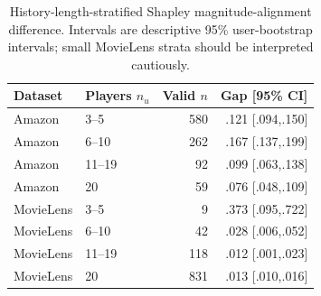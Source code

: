 \begin{table}[ht]
\centering\small
\caption{History-length-stratified Shapley magnitude-alignment difference. Intervals are descriptive 95\% user-bootstrap intervals; small MovieLens strata should be interpreted cautiously.}
\label{tab:history-stratified-gap}
\begin{tabular}{llrr}
\toprule
Dataset & Players $n_u$ & Valid $n$ & Gap [95\% CI] \\
\midrule
Amazon & 3--5 & 580 & .121 [.094,.150] \\
Amazon & 6--10 & 262 & .167 [.137,.199] \\
Amazon & 11--19 & 92 & .099 [.063,.138] \\
Amazon & 20 & 59 & .076 [.048,.109] \\
\midrule
MovieLens & 3--5 & 9 & .373 [.095,.722] \\
MovieLens & 6--10 & 42 & .028 [.006,.052] \\
MovieLens & 11--19 & 118 & .012 [.001,.023] \\
MovieLens & 20 & 831 & .013 [.010,.016] \\
\bottomrule
\end{tabular}
\end{table}